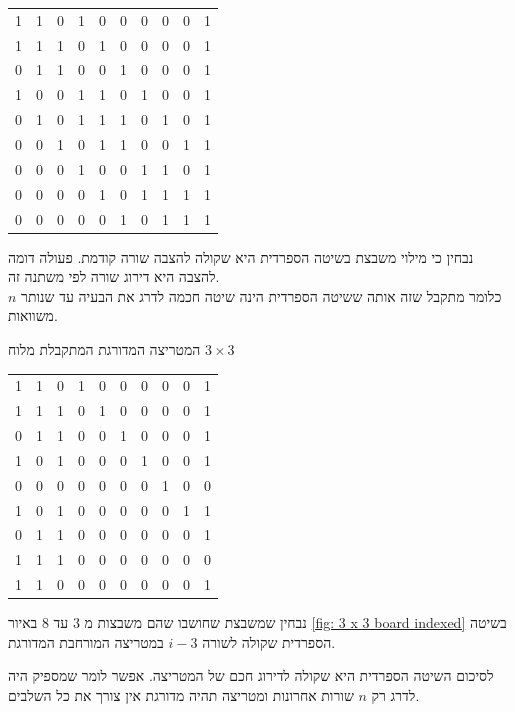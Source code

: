 \documentclass[12pt,twoside]{article}
\begin{document}
\begin{center}
    \begin{tabular}{|ccccccccc|c|}
        \hline
        1& 1& 0& 1& 0& 0& 0& 0& 0& 1 \\
        1& 1& 1& 0& 1& 0& 0& 0& 0& 1 \\
        0& 1& 1& 0& 0& 1& 0& 0& 0& 1 \\
        1& 0& 0& 1& 1& 0& 1& 0& 0& 1 \\
        0& 1& 0& 1& 1& 1& 0& 1& 0& 1 \\
        0& 0& 1& 0& 1& 1& 0& 0& 1& 1 \\
        0& 0& 0& 1& 0& 0& 1& 1& 0& 1 \\
        0& 0& 0& 0& 1& 0& 1& 1& 1& 1 \\
        0& 0& 0& 0& 0& 1& 0& 1& 1& 1 \\
        \hline
    \end{tabular}
\end{center}

נבחין כי מילוי משבצת 
בשיטה הספרדית היא שקולה להצבה 
שורה קודמת.
פעולה דומה להצבה היא 
דירוג שורה 
לפי משתנה זה.
\\
כלומר מתקבל שזה אותה ששיטה הספרדית הינה 
שיטה חכמה לדרג את הבעיה
עד שנותר 
$n$
משוואות.

המטריצה המדורגת המתקבלת
מלוח 
$3 \times 3$
   

\begin{center}
    \begin{tabular}{|ccccccccc|c|}
        \hline
1& 1& 0& 1& 0& 0& 0& 0& 0& 1 \\
1& 1& 1& 0& 1& 0& 0& 0& 0& 1 \\
0& 1& 1& 0& 0& 1& 0& 0& 0& 1 \\
1& 0& 1& 0& 0& 0& 1& 0& 0& 1\\
0& 0& 0& 0& 0& 0& 0& 1& 0& 0\\
1& 0& 1& 0& 0& 0& 0& 0& 1& 1\\
0& 1& 1& 0& 0& 0& 0& 0& 0& 1\\
1& 1& 1& 0& 0& 0& 0& 0& 0& 0\\
1& 1& 0& 0& 0& 0& 0& 0& 0& 1\\
        \hline
    \end{tabular}
\end{center}

נבחין שמשבצת שחושבו
שהם משבצות 
מ
$3$
עד 
$8$
באיור
\ref{fig: 3 x 3 board indexed}
בשיטה הספרדית
שקולה לשורה 
$i-3$
במטריצה המורחבת המדורגת.

לסיכום השיטה הספרדית היא שקולה לדירוג חכם של המטריצה.
אפשר לומר שמספיק היה לדרג רק 
$n$
שורות אחרונות ומטריצה תהיה מדורגת 
אין צורך את כל השלבים.
\end{document}
